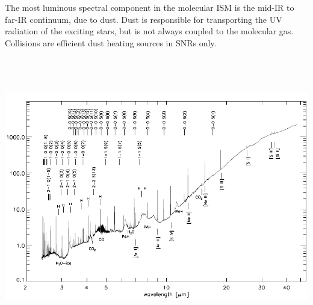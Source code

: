 The most luminous spectral component in the molecular ISM is the
mid-IR to far-IR continuum, due to dust. Dust is responsible for
transporting the UV radiation of the exciting stars, but is not always
coupled to the molecular gas. Collisions are efficient dust heating
sources in SNRs only.
\includegraphics[width=25cm,height=13cm]{./B/dishoeck_fig3.pdf}

\foilhead{}

